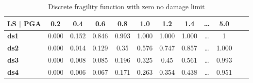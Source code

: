 \begin{table}[htbp]

\centering
\begin{tabular}{ l c c c c c c c c c c c}

\hline
\rowcolor{anti-flashwhite}
\bf{LS | PGA} & \bf{0.2} & \bf{0.4} & \bf{0.6} & \bf{0.8} & \bf{1.0} & \bf{1.2} & \bf{1.4} & \bf{\dots} & \bf{5.0} \\
\hline
\bf{ds1} & 0.000 & 0.152 & 0.846 & 0.993 & 1.000 & 1.000 & 1.000 & \dots & 1 \\
\bf{ds2} & 0.000 & 0.014 & 0.129 & 0.35 & 0.576 & 0.747 & 0.857 & \dots & 1.000 \\
\bf{ds3} & 0.000 & 0.008 & 0.085 & 0.196 & 0.325 & 0.45 & 0.561 & \dots & 0.993 \\
\bf{ds4} & 0.000 & 0.006 & 0.067 & 0.171 & 0.263 & 0.354 & 0.438 & \dots & 0.951 \\
\hline
\end{tabular}

\caption{Discrete fragility function with zero no damage limit}
\label{tab:ff-disc-zndl}
\end{table}
